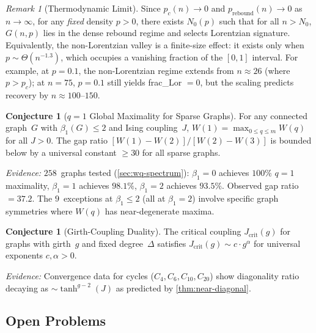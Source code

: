 \documentclass[11pt]{article}
\theoremstyle{definition}
\newtheorem{conjecture}[theorem]{Conjecture}
\theoremstyle{remark}
\newtheorem{remark}[theorem]{Remark}
\begin{document}
\begin{remark}[Thermodynamic Limit]
\label{rem:thermodynamic}
Since $p_c(n) \to 0$ and $p_{\mathrm{rebound}}(n) \to 0$ as $n \to \infty$,
for any \emph{fixed} density $p > 0$, there exists $N_0(p)$ such that for all
$n > N_0$, $G(n,p)$ lies in the dense rebound regime and selects Lorentzian
signature. Equivalently, the non-Lorentzian valley is a finite-size effect:
it exists only when $p \sim \Theta(n^{-1.3})$, which occupies a vanishing
fraction of the $[0,1]$ interval.
For example, at $p = 0.1$, the non-Lorentzian regime extends from
$n \approx 26$ (where $p > p_c$); at $n = 75$, $p = 0.1$ still yields
frac\_Lor $= 0$, but the scaling predicts recovery by $n \approx 100$--$150$.
\end{remark}

\begin{conjecture}[$q = 1$ Global Maximality for Sparse Graphs]
\label{conj:q1-global}
For any connected graph~$G$ with $\beta_1(G) \leq 2$ and Ising coupling~$J$,
$W(1) = \max_{0 \leq q \leq m} W(q)$ for all $J > 0$. The gap ratio
$[W(1) - W(2)] / [W(2) - W(3)]$ is bounded below by a universal constant
$\geq 30$ for all sparse graphs.
\end{conjecture}

\noindent\emph{Evidence:} $258$~graphs tested (\cref{sec:wq-spectrum}):
$\beta_1 = 0$ achieves $100\%$ $q{=}1$ maximality, $\beta_1 = 1$ achieves
$98.1\%$, $\beta_1 = 2$ achieves $93.5\%$. Observed gap ratio $= 37.2$.
The $9$~exceptions at $\beta_1 \leq 2$ (all at $\beta_1 = 2$) involve
specific graph symmetries where $W(q)$ has near-degenerate maxima.

\begin{conjecture}[Girth-Coupling Duality]
\label{conj:girth}
The critical coupling $J_{\mathrm{crit}}(g)$ for graphs with girth~$g$ and
fixed degree~$\Delta$ satisfies $J_{\mathrm{crit}}(g) \sim c \cdot g^\alpha$
for universal exponents $c, \alpha > 0$.
\end{conjecture}

\noindent\emph{Evidence:} Convergence data for cycles ($C_4, C_6, C_{10},
C_{20}$) show diagonality ratio decaying as $\sim \tanh^{g-2}(J)$ as predicted
by \cref{thm:near-diagonal}.

\subsection{Open Problems}
\end{document}
